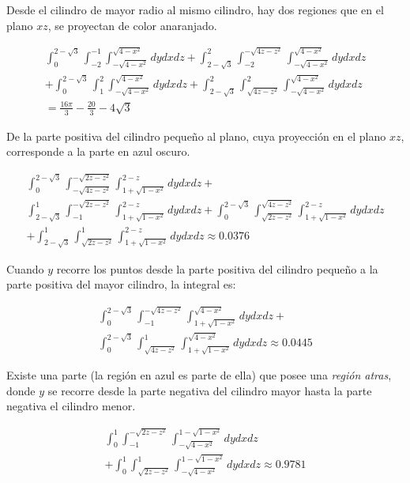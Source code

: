 Desde el cilindro de mayor radio al mismo cilindro, hay dos regiones que en el plano $xz$, se proyectan de color anaranjado.

%
\begin{eqnarray}
\int_{0}^{2-\sqrt{3}}\int_{-2}^{-1}\int_{-\sqrt{4-x^2}}^{\sqrt{4-x^2}}dydxdz
+\int_{2-\sqrt{3}}^2\int_{-2}^{-\sqrt{4z-z^2}}\int_{-\sqrt{4-x^2}}^{\sqrt{4-x^2}}dydxdz \nonumber \\
+\int_{0}^{2-\sqrt{3}}\int_{1}^2\int_{-\sqrt{4-x^2}}^{\sqrt{4-x^2}}dydxdz
+\int_{2-\sqrt{3}}^2\int_{\sqrt{4z-z^2}}^2\int_{-\sqrt{4-x^2}}^{\sqrt{4-x^2}}dydxdz \nonumber \\
= \frac{16\pi}{3}-\frac{20}{3}-4\sqrt{3} \label{31l}
\end{eqnarray}

De la parte positiva del cilindro pequeño al plano, cuya proyección en el plano $xz$, corresponde a la parte en azul oscuro.

\begin{multline}
\int_{0}^{2-\sqrt{3}}\int_{-\sqrt{4z-z^2}}^{-\sqrt{2z-z^2}}\int_{1+\sqrt{1-x^2}}^{2-z}dydxdz + \\ \int_{2-\sqrt{3}}^{1}\int_{-1}^{-\sqrt{2z-z^2}}\int_{1+\sqrt{1-x^2}}^{2-z}dydxdz+ \int_{0}^{2-\sqrt{3}}\int_{\sqrt{2z-z^2}}^{\sqrt{4z-z^2}}\int_{1+\sqrt{1-x^2}}^{2-z}dydxdz \\
+\int_{2-\sqrt{3}}^{1}\int_{\sqrt{2z-z^2}}^{1}\int_{1+\sqrt{1-x^2}}^{2-z}dydxdz \approx 0.0376 \label{31m}
\end{multline}

Cuando $y$ recorre los puntos desde la parte positiva del cilindro pequeño a la parte positiva del mayor cilindro, la integral es:

\begin{multline}
\int_{0}^{2-\sqrt{3}}\int_{-1}^{-\sqrt{4z-z^2}}\int_{1+\sqrt{1-x^2}}^{\sqrt{4-x^2}}dydxdz+ \\
\int_{0}^{2-\sqrt{3}}\int_{\sqrt{4z-z^2}}^{1}\int_{1+\sqrt{1-x^2}}^{\sqrt{4-x^2}}dydxdz \approx 0.0445 \label{31n}
\end{multline}

Existe una parte (la región en azul es parte de ella) que posee una \emph{región atras}, donde $y$ se recorre desde la parte negativa del cilindro mayor hasta la parte negativa el cilindro menor.

\begin{multline}
\int_{0}^{1}\int_{-1}^{-\sqrt{2z-z^2}}\int_{-\sqrt{4-x^2}}^{1-\sqrt{1-x^2}}dydxdz \\
+\int_{0}^{1}\int_{\sqrt{2z-z^2}}^{1}\int_{-\sqrt{4-x^2}}^{1-\sqrt{1-x^2}}dydxdz \approx 0.9781 \label{31o}
\end{multline}

